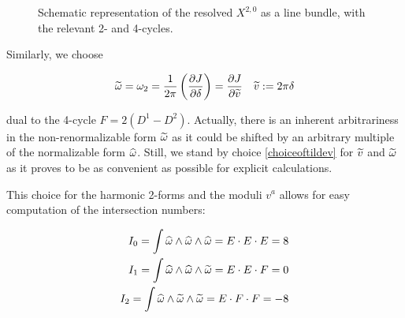\begin{figure}[H]
\centering
\def\svgwidth{100pt}
\captionsetup{width=0.8\textwidth}

\caption{Schematic representation of the resolved $X^{2,0}$ as a line bundle, with the relevant 2- and 4-cycles.}
\end{figure}

Similarly, we choose

\begin{align}
	\widetilde{\omega} = \omega_2 = \frac{1}{2\pi} \left( \frac{\partial J}{\partial\delta} \right) = \frac{\partial J}{\partial\widetilde{v}} && \widetilde{v} := 2\pi\delta
	\label{choiceoftildev}
\end{align}

dual to the 4-cycle $F = 2 (D^1 - D^2)$. Actually, there is an inherent arbitrariness in the non-renormalizable form $\widetilde{\omega}$ as it could be shifted by an arbitrary multiple of the normalizable form $\widehat{\omega}$. Still, we stand by choice \eqref{choiceoftildev} for $\widetilde{v}$ and $\widetilde{\omega}$ as it proves to be as convenient as possible for explicit calculations.


This choice for the harmonic 2-forms and the moduli $v^a$ allows for easy computation of the intersection numbers:

\begin{align}
	I_0 = \int \widehat{\omega} \wedge \widehat{\omega} \wedge \widehat{\omega} = E \cdot E \cdot E  = 8 \\
	I_1 = \int \widehat{\omega} \wedge \widehat{\omega} \wedge \widetilde{\omega} = E \cdot E \cdot F  = 0\\
	I_2 = \int \widehat{\omega} \wedge \widetilde{\omega} \wedge \widetilde{\omega} = E \cdot F \cdot F = -8
	\label{}
\end{align}

%

